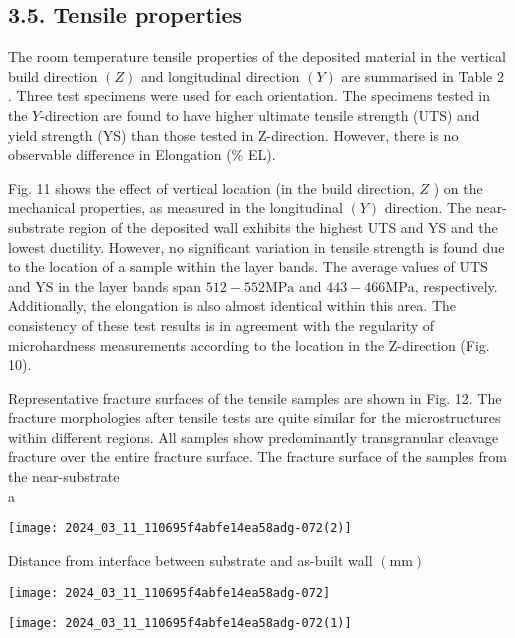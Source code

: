 \documentclass[10pt]{article}
\begin{document}
\subsection*{3.5. Tensile properties}
The room temperature tensile properties of the deposited material in the vertical build direction $(Z)$ and longitudinal direction $(Y)$ are summarised in Table 2 . Three test specimens were used for each orientation. The specimens tested in the $Y$-direction are found to have higher ultimate tensile strength (UTS) and yield strength (YS) than those tested in Z-direction. However, there is no observable difference in Elongation (\% EL).

Fig. 11 shows the effect of vertical location (in the build direction, $Z$ ) on the mechanical properties, as measured in the longitudinal $(Y)$ direction. The near-substrate region of the deposited wall exhibits the highest UTS and YS and the lowest ductility. However, no significant variation in tensile strength is found due to the location of a sample within the layer bands. The average values of UTS and $\mathrm{YS}$ in the layer bands span $512-552 \mathrm{MPa}$ and $443-466 \mathrm{MPa}$, respectively. Additionally, the elongation is also almost identical within this area. The consistency of these test results is in agreement with the regularity of microhardness measurements according to the location in the Z-direction (Fig. 10).

Representative fracture surfaces of the tensile samples are shown in Fig. 12. The fracture morphologies after tensile tests are quite similar for the microstructures within different regions. All samples show predominantly transgranular cleavage fracture over the entire fracture surface. The fracture surface of the samples from the near-substrate\\
a

\begin{center}
\texttt{[image: 2024\_03\_11\_110695f4abfe14ea58adg-072(2)]}
\end{center}

Distance from interface between substrate and as-built wall $(\mathrm{mm})$

\begin{center}
\texttt{[image: 2024\_03\_11\_110695f4abfe14ea58adg-072]}
\end{center}

\begin{center}
\texttt{[image: 2024\_03\_11\_110695f4abfe14ea58adg-072(1)]}
\end{center}
\end{document}
